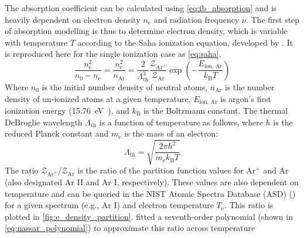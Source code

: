         The absorption coefficient can be calculated using \autoref{eq:ib_absorption} and is heavily dependent on electron density $n_\mathrm{e}$ and radiation frequency $\nu$. The first step of absorption modelling is thus to determine electron density, which is variable with temperature $T$ according to the Saha ionization equation, developed by \textcite{sahaPhysicalTheoryStellar1997}. It is reproduced here for the single ionization case as \autoref{eq:saha}.
        \begin{equation}
            \frac{n_\mathrm{e}^2}{n_0-n_\mathrm{e}} = \frac{n_\mathrm{e}^2}{n_\mathrm{Ar}} = \frac{2}{\Lambda_\mathrm{th}^3}\frac{\mathcal{Z}_{\mathrm{Ar}^+}}{\mathcal{Z}_\mathrm{Ar}}\exp{\left(-\frac{E_\text{ion, Ar}}{k_\mathrm{B}T}\right)}
            \label{eq:saha}
        \end{equation}
        Where $n_0$ is the initial number density of neutral atoms, $n_\mathrm{Ar}$ is the number density of un-ionized atoms at a given temperature, $E_\text{ion, Ar}$ is argon's first ionization energy (\qty{15.76}{eV}~\cite{liasIonizationEnergyEvaluation2023}), and $k_\mathrm{B}$ is the Boltzmann constant. The thermal DeBroglie wavelength $\Lambda_\mathrm{th}$ is a function of temperature as follows, where $\hbar$ is the reduced Planck constant and $m_\mathrm{e}$ is the mass of an electron:
        \begin{equation*}
            \Lambda_\mathrm{th} = \sqrt{\frac{2\pi \hbar^2}{m_\mathrm{e}k_\mathrm{B}T}}
        \end{equation*}
        The ratio $\mathcal{Z}_{\mathrm{Ar}^+}/\mathcal{Z}_\mathrm{Ar}$ is the ratio of the partition function values for Ar$^+$ and Ar (also designated Ar II and Ar I, respectively). These values are also dependent on temperature and can be queried in the NIST Atomic Spectra Database (ASD) (\textcite{kramidaNISTAtomicSpectra2022}) for a given spectrum (e.g., Ar I) and electron temperature $T_\mathrm{e}$. This ratio is plotted in \autoref{fig:e_density_partition}. \citeauthor{nassarInvestigationLasersustainedPlasma2012} fitted a seventh-order polynomial (shown in \autoref{eq:nassar_polynomial}) to approximate this ratio across temperature

